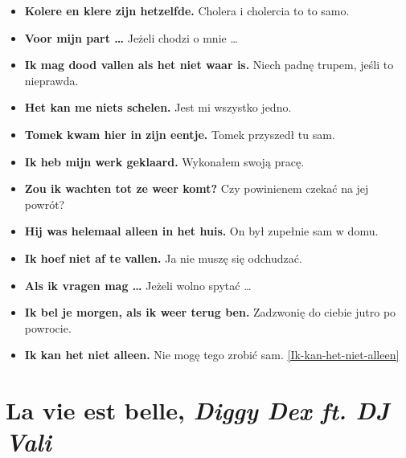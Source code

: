 \documentclass[
]{book}
\providecommand{\tightlist}{%
  \setlength{\itemsep}{0pt}\setlength{\parskip}{0pt}}
\begin{document}
\begin{itemize}
\tightlist
\item
  \textbf{Kolere en klere zijn hetzelfde.} Cholera i cholercia to to samo.\\
\item
  \textbf{Voor mijn part \ldots{}} Jeżeli chodzi o mnie \ldots{}\\
\item
  \textbf{Ik mag dood vallen als het niet waar is.} Niech padnę trupem, jeśli to nieprawda.\\
\item
  \textbf{Het kan me niets schelen.} Jest mi wszystko jedno.\\
\item
  \textbf{Tomek kwam hier in zijn eentje.} Tomek przyszedł tu sam.\\
\item
  \textbf{Ik heb mijn werk geklaard.} Wykonałem swoją pracę.\\
\item
  \textbf{Zou ik wachten tot ze weer komt?} Czy powinienem czekać na jej powrót?\\
\item
  \textbf{Hij was helemaal alleen in het huis.} On był zupełnie sam w domu.\\
\item
  \textbf{Ik hoef niet af te vallen.} Ja nie muszę się odchudzać.\\
\item
  \textbf{Als ik vragen mag \ldots{}} Jeżeli wolno spytać \ldots{}\\
\item
  \textbf{Ik bel je morgen, als ik weer terug ben.} Zadzwonię do ciebie jutro po powrocie.\\
\item
  \textbf{Ik kan het niet alleen.} Nie mogę tego zrobić sam. \ref{Ik-kan-het-niet-alleen}
\end{itemize}

\hypertarget{La-vie-est-belle}{%
\section{\texorpdfstring{La vie est belle, \emph{Diggy Dex ft. DJ Vali}}{La vie est belle, Diggy Dex ft. DJ Vali}}\label{La-vie-est-belle}}
\end{document}
